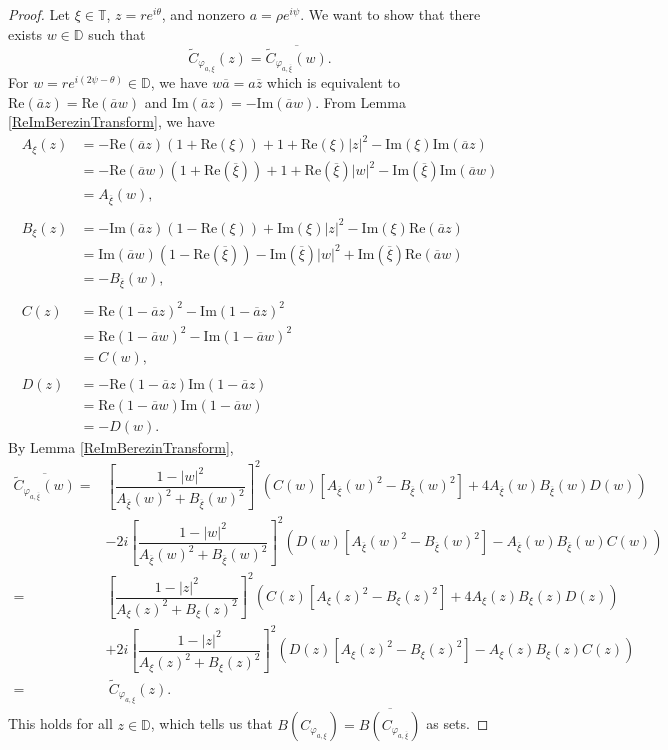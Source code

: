 \documentclass{amsart}
\theoremstyle{remark}
\begin{document}
\begin{proof}
Let $\xi \in \mathbb{T}$, $z=re^{i\theta}$, and nonzero $a=\rho e^{i\psi}$. We want to show that there exists $w \in \mathbb{D}$ such that 
\[\widetilde{C}_{\varphi_{a,\xi}}(z)= \overline{\widetilde{C}_{\varphi_{a,\overline{\xi}}}(w)}.\]
For $w=re^{i(2\psi-\theta)} \in \mathbb{D}$, we have $w\overline{a}=a\overline{z}$ which is equivalent to $\mathrm{Re}(\overline{a}z)=\mathrm{Re}(\overline{a}w)$ and $\mathrm{Im}(\overline{a}z)=-\mathrm{Im}(\overline{a}w)$.
From Lemma \ref{ReImBerezinTransform}, we have 
\begin{align*}
A_{\xi}(z) &= -\mathrm{Re}(\overline{a}z)(1+\mathrm{Re}(\xi))+ 1 + \mathrm{Re}(\xi)|z|^2-\mathrm{Im}(\xi)\mathrm{Im}(\overline{a}z) \\
&= -\mathrm{Re}(\overline{a}w)(1+\mathrm{Re}(\overline{\xi}))+ 1 + \mathrm{Re}(\overline{\xi})|w|^2-\mathrm{Im}(\overline{\xi})\mathrm{Im}(\overline{a}w) \\
&= A_{\overline{\xi}}(w), \\ \\
B_{\xi}(z) &= -\mathrm{Im}(\overline{a}z)(1-\mathrm{Re}(\xi))+\mathrm{Im}(\xi)|z|^2-\mathrm{Im}(\xi)\mathrm{Re}(\overline{a}z) \\
&= \mathrm{Im}(\overline{a}w)(1-\mathrm{Re}(\overline{\xi}))-\mathrm{Im}(\overline{\xi})|w|^2+\mathrm{Im}(\overline{\xi})\mathrm{Re}(\overline{a}w) \\
&= - B_{\overline{\xi}}(w), \\ \\
C(z) &=\mathrm{Re}(1-\overline{a}z)^2-\mathrm{Im}(1-\overline{a}z)^2 \\
&=\mathrm{Re}(1-\overline{a}w)^2-\mathrm{Im}(1-\overline{a}w)^2 \\
&= C(w), \\ \\
D(z) &= -\mathrm{Re}(1-\overline{a}z)\mathrm{Im}(1-\overline{a}z) \\
&= \mathrm{Re}(1-\overline{a}w)\mathrm{Im}(1-\overline{a}w)\\
&= -D(w).
\end{align*}
By Lemma \ref{ReImBerezinTransform},
\begin{align*}
\overline{\widetilde{C}_{\varphi_{a,\overline{\xi}}}(w)} =& \left[\dfrac{1-|w|^2}{A_{\overline{\xi}}(w)^2+B_{\overline{\xi}}(w)^2}\right]^2(C(w)[A_{\overline{\xi}}(w)^2-B_{\overline{\xi}}(w)^2]+4A_{\overline{\xi}}(w)B_{\overline{\xi}}(w)D(w))\\
& - 2i\left[\dfrac{1-|w|^2}{A_{\overline{\xi}}(w)^2+B_{\overline{\xi}}(w)^2}\right]^2(D(w)[A_{\overline{\xi}}(w)^2-B_{\overline{\xi}}(w)^2]-A_{\overline{\xi}}(w)B_{\overline{\xi}}(w)C(w)) \\ 
=& \left[\dfrac{1-|z|^2}{A_{\xi}(z)^2+B_{\xi}(z)^2}\right]^2(C(z)[A_{\xi}(z)^2-B_{\xi}(z)^2]+4A_{\xi}(z)B_{\xi}(z)D(z))\\
& + 2i\left[\dfrac{1-|z|^2}{A_{\xi}(z)^2+B_{\xi}(z)^2}\right]^2(D(z)[A_{\xi}(z)^2-B_{\xi}(z)^2]-A_{\xi}(z)B_{\xi}(z)C(z)) \\ 
=& \ \widetilde{C}_{\varphi_{a,\xi}}(z).
\end{align*}
This holds for all $z \in \mathbb{D}$, which tells us that $B(C_{\varphi_{a,\xi}})=\overline{B(C_{\varphi_{a,\overline{\xi}}})}$ as sets.  
\end{proof}
\end{document}
